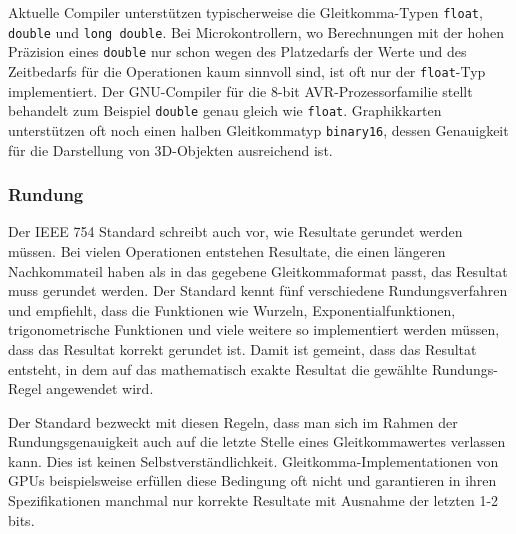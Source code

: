 Aktuelle Compiler unterstützen typischerweise die Gleitkomma-Typen
\texttt{float}, \texttt{double} und \texttt{long double}.
%
%
%
%
Bei Microkontrollern, wo Berechnungen mit der hohen Präzision
eines \texttt{double} nur schon wegen des Platzedarfs der Werte
und des Zeitbedarfs für die Operationen kaum sinnvoll sind, ist oft
nur der \texttt{float}-Typ implementiert.
%
Der GNU-Compiler für die 8-bit AVR-Prozessorfamilie stellt behandelt
zum Beispiel \texttt{double} genau gleich wie \texttt{float}.
%
%
Graphikkarten unterstützen oft noch einen halben Gleitkommatyp
\texttt{binary16}, dessen Genauigkeit für die Darstellung von 3D-Objekten
ausreichend ist.
%
%
%

\subsubsection{Rundung}
Der IEEE 754 Standard schreibt auch vor, wie Resultate gerundet werden
müssen.
%
Bei vielen Operationen entstehen Resultate, die einen längeren 
Nachkommateil haben als in das gegebene Gleitkommaformat passt,
das Resultat muss gerundet werden.
%
Der Standard kennt fünf verschiedene Rundungsverfahren und empfiehlt,
dass die Funktionen wie Wurzeln, Exponentialfunktionen,
trigonometrische Funktionen und viele weitere so implementiert werden 
müssen, dass das Resultat korrekt gerundet ist.
%
%
%
%
Damit ist gemeint, dass das Resultat entsteht, in dem auf das
mathematisch exakte Resultat die gewählte Rundungs-Regel angewendet
wird.

Der Standard bezweckt mit diesen Regeln, dass man sich im Rahmen der
Rundungsgenauigkeit auch auf die letzte Stelle eines Gleitkommawertes
verlassen kann.
Dies ist keinen Selbstverständlichkeit.
Gleitkomma-Implementationen von GPUs beispielsweise erfüllen diese
%
Bedingung oft nicht und garantieren in ihren Spezifikationen manchmal
nur korrekte Resultate mit Ausnahme der letzten 1-2 bits.

